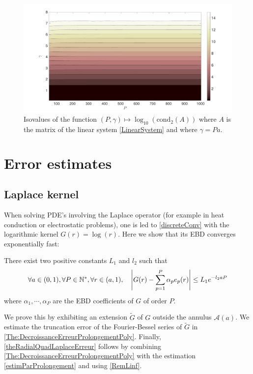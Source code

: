 \documentclass[smallextended]{svjour3}
\begin{document}
\begin{figure}[t]
	\centering\includegraphics[scale = 0.15]{isoValues-eps-converted-to}
	\caption{Isovalues of the function $(P,\gamma) \mapsto \log_{10} (\text{cond}_2(A))$ where $A$ is the matrix of the linear system \eqref{LinearSystem} and where $\gamma = Pa$. }
	\label{isoValues}
\end{figure}

												
\section{Error estimates}
\label{sec:ApplicationLaplaceHelmholtz}
\subsection{Laplace kernel}
When solving PDE's involving the Laplace operator (for example in heat conduction or electrostatic problems), one is led to \eqref{discreteConv} with the logarithmic kernel $G(r) = \log(r)$. Here we show that its EBD converges exponentially fast:
\begin{theorem} 
	\label{theRadialQuadLaplaceErreur}
	There exist two positive constants $L_1$ and $l_2$ such that
	\[ \forall a \in (0,1), \forall P \in \mathbb{N}^*, \forall r \in (a,1), \quad \left\lvert G(r) - \sum_{p=1}^P \alpha_p e_p(r) \right\rvert \leq L_1 e^{-l_2 a P} \]
	where $\alpha_1,\cdots,\alpha_P$ are the EBD coefficients of $G$ of order $P$.  
\end{theorem}
We prove this by exhibiting an extension $\tilde{G}$ of $G$ outside the annulus $\mathcal{A}(a)$. We estimate the truncation error of the Fourier-Bessel series of $\tilde{G}$ in \autoref{The:DecroissanceErreurProlongementPoly}. Finally, \autoref{theRadialQuadLaplaceErreur} follows by combining \autoref{The:DecroissanceErreurProlongementPoly} with the estimation \eqref{estimParProlongement} and using \autoref{RemLinf}.
\end{document}
